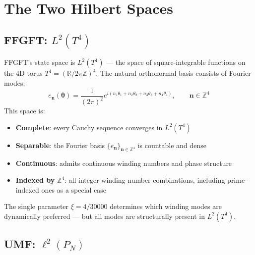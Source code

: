 \clearpage

\section{The Two Hilbert Spaces}

\subsection{FFGFT: \texorpdfstring{$L^2(T^4)$}{L2(T4)}}

FFGFT's state space is $L^2(T^4)$ — the space of square-integrable functions
on the 4D torus $T^4 = (\mathbb{R}/2\pi\mathbb{Z})^4$. The natural orthonormal
basis consists of Fourier modes:
\begin{equation}
  e_{\mathbf{n}}(\symbf{\theta}) = \frac{1}{(2\pi)^2}
  e^{i(n_1\theta_1 + n_2\theta_2 + n_3\theta_3 + n_4\theta_4)},
  \qquad \mathbf{n} \in \mathbb{Z}^4
  \tag{244.1}
\end{equation}
This space is:
\begin{itemize}
  \item \textbf{Complete}: every Cauchy sequence converges in $L^2(T^4)$
  \item \textbf{Separable}: the Fourier basis $\{e_{\mathbf{n}}\}_{\mathbf{n}\in\mathbb{Z}^4}$
    is countable and dense
  \item \textbf{Continuous}: admits continuous winding numbers and phase structure
  \item \textbf{Indexed by} $\mathbb{Z}^4$: all integer winding number combinations,
    including prime-indexed ones as a special case
\end{itemize}

The single parameter $\xi = 4/30000$ determines which winding modes are
dynamically preferred — but all modes are structurally present in $L^2(T^4)$.

\subsection{UMF: \texorpdfstring{$\ell^2(P_N)$}{ell2(P\_N)}}

